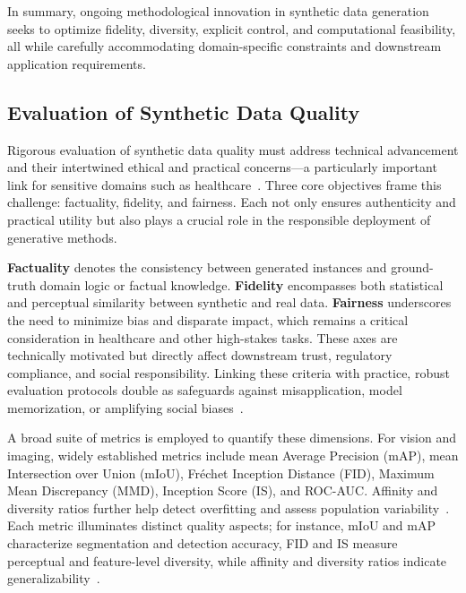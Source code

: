 \documentclass[sigconf]{acmart}
\begin{document}
In summary, ongoing methodological innovation in synthetic data generation seeks to optimize fidelity, diversity, explicit control, and computational feasibility, all while carefully accommodating domain-specific constraints and downstream application requirements.

\subsection{Evaluation of Synthetic Data Quality}

Rigorous evaluation of synthetic data quality must address technical advancement and their intertwined ethical and practical concerns—a particularly important link for sensitive domains such as healthcare~\cite{ref87}\cite{ref88}\cite{ref89}. Three core objectives frame this challenge: factuality, fidelity, and fairness. Each not only ensures authenticity and practical utility but also plays a crucial role in the responsible deployment of generative methods.

\textbf{Factuality} denotes the consistency between generated instances and ground-truth domain logic or factual knowledge. \textbf{Fidelity} encompasses both statistical and perceptual similarity between synthetic and real data. \textbf{Fairness} underscores the need to minimize bias and disparate impact, which remains a critical consideration in healthcare and other high-stakes tasks. These axes are technically motivated but directly affect downstream trust, regulatory compliance, and social responsibility. Linking these criteria with practice, robust evaluation protocols double as safeguards against misapplication, model memorization, or amplifying social biases~\cite{ref88}\cite{ref87}. 

A broad suite of metrics is employed to quantify these dimensions. For vision and imaging, widely established metrics include mean Average Precision (mAP), mean Intersection over Union (mIoU), Fréchet Inception Distance (FID), Maximum Mean Discrepancy (MMD), Inception Score (IS), and ROC-AUC. Affinity and diversity ratios further help detect overfitting and assess population variability~\cite{ref1}\cite{ref2}\cite{ref3}\cite{ref12}\cite{ref14}\cite{ref15}\cite{ref18}\cite{ref21}\cite{ref22}\cite{ref24}\cite{ref31}\cite{ref34}\cite{ref43}\cite{ref60}\cite{ref64}\cite{ref68}\cite{ref88}\cite{ref90}\cite{ref93}\cite{ref95}\cite{ref101}\cite{ref102}. Each metric illuminates distinct quality aspects; for instance, mIoU and mAP characterize segmentation and detection accuracy, FID and IS measure perceptual and feature-level diversity, while affinity and diversity ratios indicate generalizability~\cite{ref64}. 
\end{document}
